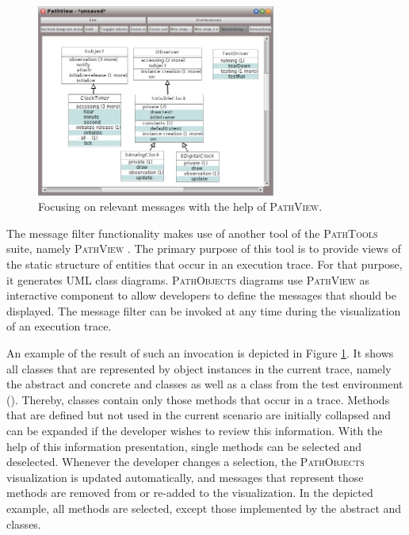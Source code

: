 \begin{figure}[tb]
	\centering
	\includegraphics[width=0.7\textwidth]{../images/04-ImplMessageFilter}
	\caption{Focusing on relevant messages with the help of \textsc{PathView}.}
	\label{fig:ImplementationFocusingMessages}
\end{figure}

The message filter functionality makes use of another tool of the \textsc{PathTools} suite, namely \textsc{PathView} \cite{perscheid_test-driven_2013}.
The primary purpose of this tool is to provide views of the static structure of entities that occur in an execution trace.
For that purpose, it generates UML class diagrams.
\textsc{PathObjects} diagrams use \textsc{PathView} as interactive component to allow developers to define the messages that should be displayed.
The message filter can be invoked at any time during the visualization of an execution trace.

An example of the result of such an invocation is depicted in Figure \ref{fig:ImplementationFocusingMessages}.
It shows all classes that are represented by object instances in the current trace, namely the abstract and concrete  and  classes as well as a class from the test environment ().
Thereby, classes contain only those methods that occur in a trace.
Methods that are defined but not used in the current scenario are initially collapsed and can be expanded if the developer wishes to review this information.
With the help of this information presentation, single methods can be selected and deselected.
Whenever the developer changes a selection, the \textsc{PathObjects} visualization is updated automatically, and messages that represent those methods are removed from or re-added to the visualization.
In the depicted example, all methods are selected, except those implemented by the abstract  and  classes.

